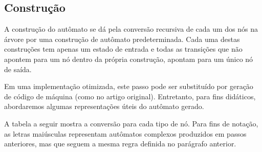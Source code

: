 \documentclass[a4paper,12pt,oneside,onecolumn]{uerj}
\begin{document}
\subsection{Construção}

A construção do autômato se dá pela conversão recursiva de cada um dos nós na árvore por uma construção de autômato predeterminada. Cada uma destas construções tem apenas um estado de entrada e todas as transições que não apontem para um nó dentro da própria construção, apontam para um único nó de saída.

Em uma implementação otimizada, este passo pode ser substituído por geração de código de máquina (como no artigo original). Entretanto, para fins didáticos, abordaremos algumas representações úteis do autômato gerado.

A tabela a seguir mostra a conversão para cada tipo de nó. Para fins de notação, as letras maiúsculas representam autômatos complexos produzidos em passos anteriores, mas que seguem a mesma regra definida no parágrafo anterior.
\end{document}
